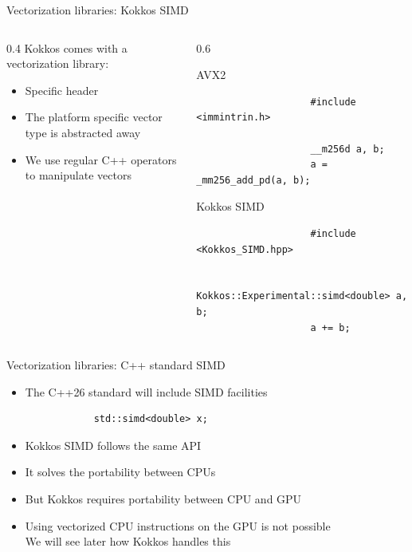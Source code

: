 \documentclass[
    aspectratio=169,
]{beamer}
\renewcommand{\caption}[1]{%
    \begin{center}
        \color{darkgray}
        \scriptsize #1
    \end{center}%
}
\begin{document}
\begin{frame}[fragile]{Vectorization libraries: Kokkos SIMD}
    \begin{columns}
        \begin{column}{0.4\linewidth}
            Kokkos comes with a vectorization library: 
            \begin{itemize}
                \item Specific header
                \item The platform specific vector type is abstracted away
                \item We use regular C++ operators to manipulate vectors
            \end{itemize}
        \end{column}
        \begin{column}{0.6\linewidth}
            \begin{center}
                \caption{AVX2}
                \begin{verbatim}
                    #include <immintrin.h>

                    __m256d a, b;
                    a = _mm256_add_pd(a, b);
                \end{verbatim}
            \end{center}
            \begin{center}
                \caption{Kokkos SIMD}
                \begin{verbatim}
                    #include <Kokkos_SIMD.hpp>

                    Kokkos::Experimental::simd<double> a, b;
                    a += b;
                \end{verbatim}
            \end{center}
        \end{column}
    \end{columns}
\end{frame}

\begin{frame}[fragile]{Vectorization libraries: C++ standard SIMD}
    \begin{itemize}
        \item The C++26 standard will include SIMD facilities
        \begin{verbatim}
            std::simd<double> x;
        \end{verbatim}
        \item Kokkos SIMD follows the same API
        \item It solves the portability between CPUs
        \item But Kokkos requires portability between CPU and GPU
        \item Using vectorized CPU instructions on the GPU is not possible \\
        We will see later how Kokkos handles this
    \end{itemize}
\end{frame}
\end{document}
